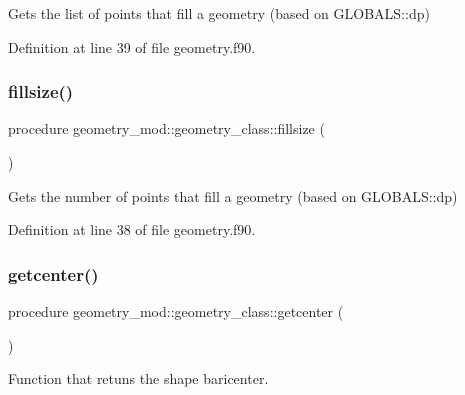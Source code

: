 Gets the list of points that fill a geometry (based on G\+L\+O\+B\+A\+L\+S\+::dp) 



Definition at line 39 of file geometry.\+f90.

\mbox{\label{structgeometry__mod_1_1geometry__class_a75f5a37d0b38c8baf66ee5089ea44d7a}} 
\subsubsection{\texorpdfstring{fillsize()}{fillsize()}}
{\footnotesize\ttfamily procedure geometry\+\_\+mod\+::geometry\+\_\+class\+::fillsize (\begin{DoxyParamCaption}{ }\end{DoxyParamCaption})\hspace{0.3cm}{\ttfamily [private]}}



Gets the number of points that fill a geometry (based on G\+L\+O\+B\+A\+L\+S\+::dp) 



Definition at line 38 of file geometry.\+f90.

\mbox{\label{structgeometry__mod_1_1geometry__class_a691891378a677185f2f13e736f68ff11}} 
\subsubsection{\texorpdfstring{getcenter()}{getcenter()}}
{\footnotesize\ttfamily procedure geometry\+\_\+mod\+::geometry\+\_\+class\+::getcenter (\begin{DoxyParamCaption}{ }\end{DoxyParamCaption})\hspace{0.3cm}{\ttfamily [private]}}



Function that retuns the shape baricenter. 



